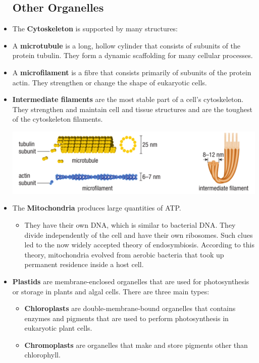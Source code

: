 \documentclass[letterpaper]{article}
\numberwithin{equation}{section}
\theoremstyle{classic}
\begin{document}
\begin{itemize}
    \subsection{Other Organelles}
    \item The \textbf{Cytoskeleton} is supported by many structures:
    \item A \textbf{microtubule} is a long, hollow cylinder that consists of subunits of the protein tubulin. They form a dynamic scaffolding for many cellular processes.
    \item A \textbf{microfilament} is a fibre that consists primarily of subunits of the protein actin. They strengthen or change the shape of eukaryotic cells.
    \item \textbf{Intermediate filaments} are the most stable part of a cell’s cytoskeleton. They strengthen and maintain cell and tissue structures and are the toughest of the cytoskeleton filaments.
    \begin{center}\includegraphics[width=\linewidth]{A11.PNG}\end{center}
    \newpage
    \item The \textbf{Mitochondria} produces large quantities of ATP.
    \begin{itemize}
        \item They have their own DNA, which is similar to bacterial DNA. They divide independently of the cell and have their own ribosomes. Such clues led to the now widely accepted theory of endosymbiosis. According to this theory, mitochondria evolved from aerobic bacteria that took up permanent residence inside a host cell.
    \end{itemize}
    \item \textbf{Plastids} are membrane-enclosed organelles that are used for photosynthesis or storage in plants and algal cells. There are three main types:
    \begin{itemize}
        \item \textbf{Chloroplasts} are double-membrane-bound organelles that contains enzymes and pigments that are used to perform photosynthesis in eukaryotic plant cells.
        \item \textbf{Chromoplasts} are organelles that make and store pigments other than chlorophyll.

\end{itemize}
\end{itemize}
\end{document}
